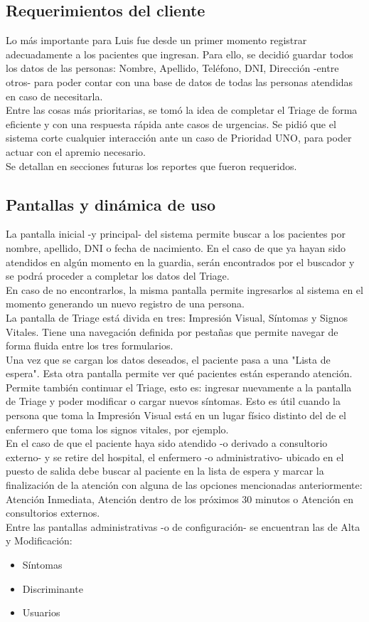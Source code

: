 \subsection{Requerimientos del cliente}
Lo más importante para Luis fue desde un primer momento registrar adecuadamente a los pacientes que ingresan. Para ello, se decidió guardar todos los datos de las personas: Nombre, Apellido, Teléfono, DNI, Dirección -entre otros- para poder contar con una base de datos de todas las personas atendidas en caso de necesitarla. \\
Entre las cosas más prioritarias, se tomó la idea de completar el Triage de forma eficiente y con una respuesta rápida ante casos de urgencias. Se pidió que el sistema corte cualquier interacción ante un caso de Prioridad UNO, para poder actuar con el apremio necesario.\\
Se detallan en secciones futuras los reportes que fueron requeridos.


\subsection{Pantallas y dinámica de uso}
La pantalla inicial -y principal- del sistema permite buscar a los pacientes por nombre, apellido, DNI o fecha de nacimiento. En el caso de que ya hayan sido atendidos en algún momento en la guardia, serán encontrados por el buscador y se podrá proceder a completar los datos del Triage. \\
En caso de no encontrarlos, la misma pantalla permite ingresarlos al sistema en el momento generando un nuevo registro de una persona. \\
La pantalla de Triage está divida en tres: Impresión Visual, Síntomas y Signos Vitales. Tiene una navegación definida por pestañas que permite navegar de forma fluida entre los tres formularios. \\
Una vez que se cargan los datos deseados, el paciente pasa a una "Lista de espera". Esta otra pantalla permite ver qué pacientes están esperando atención. Permite también continuar el Triage, esto es: ingresar nuevamente a la pantalla de Triage y poder modificar o cargar nuevos síntomas. Esto es útil cuando la persona que toma la Impresión Visual está en un lugar físico distinto del de el enfermero que toma los signos vitales, por ejemplo. \\
En el caso de que el paciente haya sido atendido -o derivado a consultorio externo- y se retire del hospital, el enfermero -o administrativo- ubicado en el puesto de salida debe buscar al paciente en la lista de espera y marcar la finalización de la atención con alguna de las opciones mencionadas anteriormente: Atención Inmediata, Atención dentro de los próximos 30 minutos o Atención en consultorios externos.\\
Entre las pantallas administrativas -o de configuración- se encuentran las de Alta y Modificación:
\begin{itemize}
\item Síntomas
\item Discriminante
\item Usuarios
\end{itemize}

